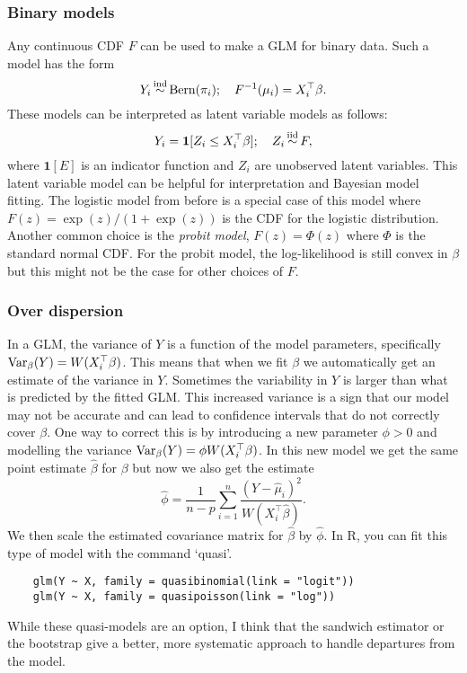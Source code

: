 \subsubsection*{Binary models} Any continuous CDF $F$ can be used to make a GLM for binary data. Such a model has the form
\[Y_i \simind \mathrm{Bern}(\pi_i); \quad F^{-1}(\mu_i) = X_i^\top \beta. \]
These models can be interpreted as latent variable models as follows:
\[Y_i = \mathbf{1}[Z_i \le X_i^\top \beta]; \quad Z_i \simiid F, \]
where $\mathbf{1}[E]$ is an indicator function and $Z_i$ are unobserved latent variables. This latent variable model can be helpful for interpretation and Bayesian model fitting. The logistic model from before is a special case of this model where $F(z) = \exp(z)/(1+\exp(z))$ is the CDF for the logistic distribution. Another common choice is the \emph{probit model}, $F(z) = \Phi(z)$ where $\Phi$ is the standard normal CDF. For the probit model, the log-likelihood is still convex in $\beta$ but this might not be the case for other choices of $F$.

\subsubsection*{Over dispersion} In a GLM, the variance of $Y$ is a function of the model parameters, specifically $\mathrm{Var}_\beta(Y) = W(X_i^\top \beta)$. This means that when we fit $\beta$ we automatically get an estimate of the variance in $Y$. Sometimes the variability in $Y$ is larger than what is predicted by the fitted GLM. This increased variance is a sign that our model may not be accurate and can lead to confidence intervals that do not correctly cover $\beta$. One way to correct this is by introducing a new parameter $\phi >0$ and modelling the variance $\mathrm{Var}_\beta(Y) = \phi W(X_i^\top \beta)$. In this new model we get the same  point estimate $\hat{\beta}$ for $\beta$ but now we also get the estimate
\[\hat{\phi} = \frac{1}{n-p} \sum_{i=1}^n \frac{(Y-\hat{\mu}_i)^2}{W(X_i^\top \hat{\beta})}. \]
We then scale the estimated covariance matrix for $\hat{\beta}$ by $\hat{\phi}$. In R, you can fit this type of model with the command `quasi'.

\begin{verbatim}
    glm(Y ~ X, family = quasibinomial(link = "logit"))
    glm(Y ~ X, family = quasipoisson(link = "log"))
\end{verbatim}

While these quasi-models are an option, I think that the sandwich estimator or the bootstrap give a better, more systematic approach to handle departures from the model. 